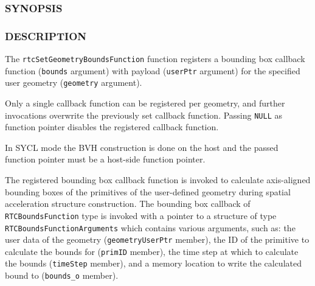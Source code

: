 \subsubsection{SYNOPSIS}\label{synopsis}

\begin{Shaded}
\begin{Highlighting}[]

\OperatorTok{\{}
  \OperatorTok{*}\OperatorTok{;}
   \OperatorTok{;}
   \OperatorTok{;}
  \OperatorTok{*}\OperatorTok{;}
\OperatorTok{\};}

  \OperatorTok{(*}\OperatorTok{)(}
   \OperatorTok{*}
\OperatorTok{);}

\OperatorTok{(}
\OperatorTok{,}
\OperatorTok{,}
  \OperatorTok{*}
\OperatorTok{);}
\end{Highlighting}
\end{Shaded}

\subsubsection{DESCRIPTION}\label{description}

The \texttt{rtcSetGeometryBoundsFunction} function registers a bounding
box callback function (\texttt{bounds} argument) with payload
(\texttt{userPtr} argument) for the specified user geometry
(\texttt{geometry} argument).

Only a single callback function can be registered per geometry, and
further invocations overwrite the previously set callback function.
Passing \texttt{NULL} as function pointer disables the registered
callback function.

In SYCL mode the BVH construction is done on the host and the passed
function pointer must be a host-side function pointer.

The registered bounding box callback function is invoked to calculate
axis-aligned bounding boxes of the primitives of the user-defined
geometry during spatial acceleration structure construction. The
bounding box callback of \texttt{RTCBoundsFunction} type is invoked with
a pointer to a structure of type \texttt{RTCBoundsFunctionArguments}
which contains various arguments, such as: the user data of the geometry
(\texttt{geometryUserPtr} member), the ID of the primitive to calculate
the bounds for (\texttt{primID} member), the time step at which to
calculate the bounds (\texttt{timeStep} member), and a memory location
to write the calculated bound to (\texttt{bounds\_o} member).

